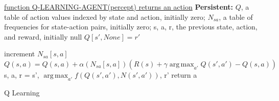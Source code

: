 \documentclass[12pt]{article}
\begin{document}
\begin{algorithm}

    \underline{function Q-LEARNING-AGENT(percept) returns an action} \;
    \textbf{Persistent:} 
    {$Q$}, a table of action values indexed by state and action, initially zero; 
    $N_{sa}$, a table of frequencies for state-action pairs, initially zero; 
    s, a, r, the previous state, action, and reward, initially null \;
      {
        $Q[s', None] = r'$
      }
      
      {
        increment $N_{sa}[s, a]$ \;        	
	$Q(s, a) = Q(s, a) + \alpha(N_{sa}[s, a])(R(s) + \gamma \operatorname*{arg\,max}_{a'}{Q(s', a')} - Q(s, a))$
      }
      s, a, r = s', $\operatorname*{arg\,max}_{a'}f(Q(s', a'), N(s', a'))$, r' \;
      return a
      \caption{Q Learning}
\end{algorithm}
\end{document}

